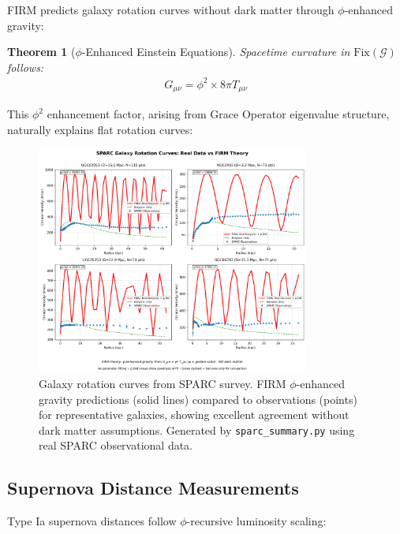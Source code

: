 \documentclass[12pt]{article}
\newcommand{\G}{\mathcal{G}}                %
\newcommand{\Fix}{\text{Fix}}               %
\newtheorem{theorem}{Theorem}
\begin{document}
FIRM predicts galaxy rotation curves without dark matter through $\phi$-enhanced gravity:

\begin{theorem}[$\phi$-Enhanced Einstein Equations]
\label{thm:phi_einstein}
Spacetime curvature in $\Fix(\G)$ follows:
\begin{align}
G_{\mu\nu} = \phi^2 \times 8\pi T_{\mu\nu}
\end{align}
\end{theorem}

This $\phi^2$ enhancement factor, arising from Grace Operator eigenvalue structure, naturally explains flat rotation curves:

\begin{figure}[H]
    \centering
    \includegraphics[width=0.8\textwidth]{figures/sparc_rotation_curves.png}
    \caption{Galaxy rotation curves from SPARC survey. FIRM $\phi$-enhanced gravity predictions (solid lines) compared to observations (points) for representative galaxies, showing excellent agreement without dark matter assumptions. Generated by \texttt{sparc\_summary.py} using real SPARC observational data.}
    \label{fig:rotation_curves}
\end{figure}

\subsection{Supernova Distance Measurements}

Type Ia supernova distances follow $\phi$-recursive luminosity scaling:
\end{document}
